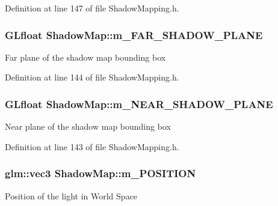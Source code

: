 Definition at line 147 of file Shadow\+Mapping.\+h.

\subsubsection[{\texorpdfstring{m\+\_\+\+F\+A\+R\+\_\+\+S\+H\+A\+D\+O\+W\+\_\+\+P\+L\+A\+NE}{m_FAR_SHADOW_PLANE}}]{\setlength{\rightskip}{0pt plus 5cm}G\+Lfloat Shadow\+Map\+::m\+\_\+\+F\+A\+R\+\_\+\+S\+H\+A\+D\+O\+W\+\_\+\+P\+L\+A\+NE\hspace{0.3cm}{\ttfamily [private]}}\hypertarget{class_shadow_map_ad4391126d86ecbd472125b86e38665b3}{}\label{class_shadow_map_ad4391126d86ecbd472125b86e38665b3}
Far plane of the shadow map bounding box 

Definition at line 144 of file Shadow\+Mapping.\+h.

\subsubsection[{\texorpdfstring{m\+\_\+\+N\+E\+A\+R\+\_\+\+S\+H\+A\+D\+O\+W\+\_\+\+P\+L\+A\+NE}{m_NEAR_SHADOW_PLANE}}]{\setlength{\rightskip}{0pt plus 5cm}G\+Lfloat Shadow\+Map\+::m\+\_\+\+N\+E\+A\+R\+\_\+\+S\+H\+A\+D\+O\+W\+\_\+\+P\+L\+A\+NE\hspace{0.3cm}{\ttfamily [private]}}\hypertarget{class_shadow_map_a12457178e044128f6beaeafc6cff362c}{}\label{class_shadow_map_a12457178e044128f6beaeafc6cff362c}
Near plane of the shadow map bounding box 

Definition at line 143 of file Shadow\+Mapping.\+h.

\subsubsection[{\texorpdfstring{m\+\_\+\+P\+O\+S\+I\+T\+I\+ON}{m_POSITION}}]{\setlength{\rightskip}{0pt plus 5cm}glm\+::vec3 Shadow\+Map\+::m\+\_\+\+P\+O\+S\+I\+T\+I\+ON\hspace{0.3cm}{\ttfamily [private]}}\hypertarget{class_shadow_map_ac4dd84a1069dfb1d9d5e63fcf917947b}{}\label{class_shadow_map_ac4dd84a1069dfb1d9d5e63fcf917947b}
Position of the light in World Space 

